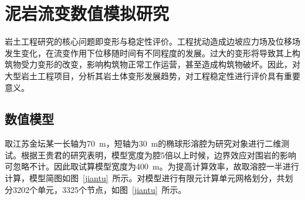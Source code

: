 \chapter{泥岩流变数值模拟研究}
岩土工程研究的核心问题即变形与稳定性评价。工程扰动造成边坡应力场及位移场发生变化，在流变作用下位移随时间有不同程度的发展。过大的变形将导致其上构筑物受力变形的改变，影响构筑物正常工作运营，甚至造成构筑物破坏。因此，对大型岩土工程项目，分析其岩土体变形发展趋势，对工程稳定性进行评价具有重要意义。





\section{数值模型}

取江苏金坛某一长轴为\SI{70}{m}，短轴为\SI{30}{m}的椭球形溶腔为研究对象进行二维测试。根据王贵君\cite{王贵君2003盐岩层中天然气存储洞室围岩长期变形特征}的研究表明，模型宽度为腔\num{5}倍以上时候，边界效应对围岩的影响可忽略不计。因此取试算模型宽度为\SI{400}{m}。为提高计算效率，故取溶腔一半进行计算，模型简图如图~\ref{jiantu}~所示。对模型进行有限元计算单元网格划分，共划分\num{3202}个单元，\num{3325}个节点，如图~\ref{jiantu}~所示。


